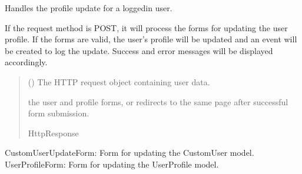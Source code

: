 \documentclass[letterpaper,10pt,english]{sphinxmanual}
\begin{document}
\begin{fulllineitems}
\label{\detokenize{modules/views:account.views.update_profile}}
\pysigstartsignatures
{}
\pysigstopsignatures
\sphinxAtStartPar
Handles the profile update for a logged\sphinxhyphen{}in user.

\sphinxAtStartPar
If the request method is POST, it will process the forms for updating the
user profile. If the forms are valid, the user’s profile will be updated and
an event will be created to log the update. Success and error messages will
be displayed accordingly.
\begin{quote}\begin{description}
\sphinxAtStartPar
{} () \textendash{} The HTTP request object containing user data.

\sphinxAtStartPar
\begin{description}
\sphinxAtStartPar
the user and profile forms, or redirects to the same page
after successful form submission.

\end{description}


\sphinxAtStartPar
HttpResponse

\end{description}\end{quote}
\begin{description}
\sphinxAtStartPar
CustomUserUpdateForm: Form for updating the CustomUser model.
UserProfileForm: Form for updating the UserProfile model.

\end{description}

\end{fulllineitems}

\end{document}
